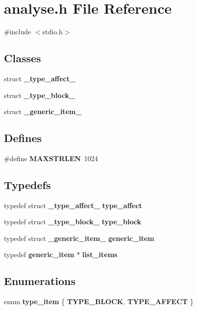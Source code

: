 \section{analyse.h File Reference}
\label{analyse_8h}
{\ttfamily \#include $<$stdio.h$>$}\par
\subsection*{Classes}
\begin{DoxyCompactItemize}
\item 
struct {\bf \_\-type\_\-affect\_\-}
\item 
struct {\bf \_\-type\_\-block\_\-}
\item 
struct {\bf \_\-generic\_\-item\_\-}
\end{DoxyCompactItemize}
\subsection*{Defines}
\begin{DoxyCompactItemize}
\item 
\#define {\bf MAXSTRLEN}~1024
\end{DoxyCompactItemize}
\subsection*{Typedefs}
\begin{DoxyCompactItemize}
\item 
typedef struct {\bf \_\-type\_\-affect\_\-} {\bf type\_\-affect}
\item 
typedef struct {\bf \_\-type\_\-block\_\-} {\bf type\_\-block}
\item 
typedef struct {\bf \_\-generic\_\-item\_\-} {\bf generic\_\-item}
\item 
typedef {\bf generic\_\-item} $\ast$ {\bf list\_\-items}
\end{DoxyCompactItemize}
\subsection*{Enumerations}
\begin{DoxyCompactItemize}
\item 
enum {\bf type\_\-item} \{ {\bf TYPE\_\-BLOCK}, 
{\bf TYPE\_\-AFFECT}
 \}
\end{DoxyCompactItemize}
